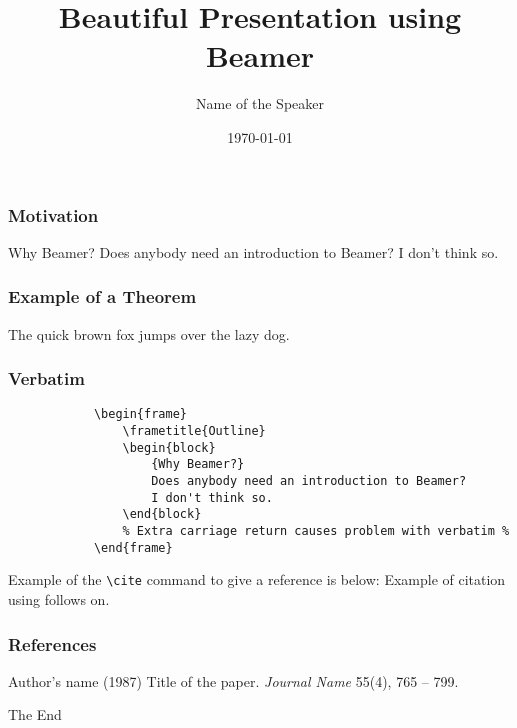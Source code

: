 \documentclass{beamer}
\title[Short title of the presentation]{Beautiful Presentation using Beamer}
\author{Name of the Speaker}
\institute[U of X]
{
University of [...] \\
\medskip
{\emph{email@domain.ca}}
}
\date{\today}
\begin{document}
\begin{frame}
    \titlepage
\end{frame}

\begin{frame}
    \frametitle{Motivation}
    \begin{block}
        {Why Beamer?}
        Does anybody need an introduction to Beamer? I don't think so.
    \end{block}
\end{frame}

\begin{frame}
    \frametitle{Example of a Theorem}
    \begin{theorem}
        The quick brown fox jumps over the lazy dog.
    \end{theorem}
\end{frame}

\begin{frame}[fragile]
    \frametitle{Verbatim}
    \begin{example}
        \begin{verbatim}
            \begin{frame}
                \frametitle{Outline}
                \begin{block}
                    {Why Beamer?}
                    Does anybody need an introduction to Beamer?
                    I don't think so.
                \end{block}
                % Extra carriage return causes problem with verbatim %
            \end{frame}
        \end{verbatim}
    \end{example}
\end{frame}

\begin{frame}[fragile]
    Example of the \verb|\cite| command to give a reference is below:
    Example of citation using \cite{key1} follows on.
\end{frame}

\begin{frame}
    \frametitle{References}
    \footnotesize
    {
        \begin{thebibliography}{99}
             Author's name (1987)
            \newblock Title of the paper.
            \newblock \emph{Journal Name} 55(4), 765 -- 799.
        \end{thebibliography}
    }
\end{frame}

\begin{frame}
    \centerline{The End}
\end{frame}
\end{document}
